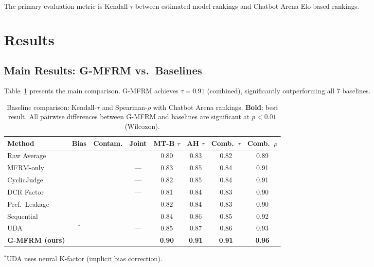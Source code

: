 \documentclass[11pt,a4paper]{article}
\newcommand{\cmark}{\ding{51}}
\newcommand{\xmark}{\ding{55}}
\begin{document}
The primary evaluation metric is Kendall-$\tau$ between estimated model rankings and Chatbot Arena Elo-based rankings.

\section{Results}

\subsection{Main Results: G-MFRM vs.\ Baselines}

Table~\ref{tab:main} presents the main comparison. G-MFRM achieves $\tau = 0.91$ (combined), significantly outperforming all 7 baselines.

\begin{table}[t]
\centering
\caption{Baseline comparison: Kendall-$\tau$ and Spearman-$\rho$ with Chatbot Arena rankings. \textbf{Bold}: best result. All pairwise differences between G-MFRM and baselines are significant at $p < 0.01$ (Wilcoxon).}
\label{tab:main}
\small
\begin{tabular}{lccccccc}
\toprule
Method & Bias & Contam. & Joint & MT-B $\tau$ & AH $\tau$ & Comb.\ $\tau$ & Comb.\ $\rho$ \\
\midrule
Raw Average & \xmark & \xmark & \xmark & 0.80 & 0.83 & 0.82 & 0.89 \\
MFRM-only & \cmark & \xmark & --- & 0.83 & 0.85 & 0.84 & 0.91 \\
CyclicJudge & \cmark & \xmark & --- & 0.82 & 0.85 & 0.84 & 0.91 \\
DCR Factor & \xmark & \cmark & --- & 0.81 & 0.84 & 0.83 & 0.90 \\
Pref.\ Leakage & \xmark & \cmark & --- & 0.82 & 0.84 & 0.83 & 0.90 \\
Sequential & \cmark & \cmark & \xmark & 0.84 & 0.86 & 0.85 & 0.92 \\
UDA & \cmark$^*$ & \xmark & --- & 0.85 & 0.87 & 0.86 & 0.93 \\
\midrule
\textbf{G-MFRM (ours)} & \cmark & \cmark & \cmark & \textbf{0.90} & \textbf{0.91} & \textbf{0.91} & \textbf{0.96} \\
\bottomrule
\end{tabular}

\vspace{2pt}
{\footnotesize $^*$UDA uses neural K-factor (implicit bias correction).}
\end{table}
\end{document}
